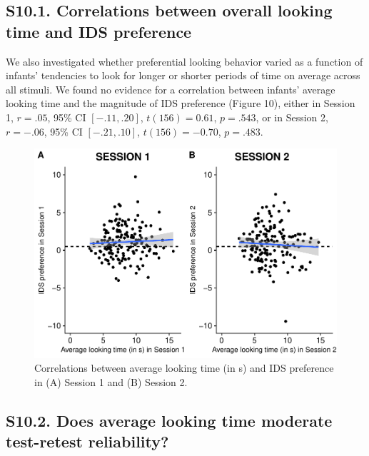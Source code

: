 \documentclass[
  english,
  man, donotrepeattitle,floatsintext]{apa6}
\begin{document}
\hypertarget{s10.1.-correlations-between-overall-looking-time-and-ids-preference}{%
\subsection{S10.1. Correlations between overall looking time and IDS preference}\label{s10.1.-correlations-between-overall-looking-time-and-ids-preference}}

We also investigated whether preferential looking behavior varied as a function of infants' tendencies to look for longer or shorter periods of time on average across all stimuli. We found no evidence for a correlation between infants' average looking time and the magnitude of IDS preference (Figure 10), either in Session 1, \(r = .05\), 95\% CI \([-.11, .20]\), \(t(156) = 0.61\), \(p = .543\), or in Session 2, \(r = -.06\), 95\% CI \([-.21, .10]\), \(t(156) = -0.70\), \(p = .483\).

\begin{figure}

{\centering \includegraphics{MB1T_supplement_files/figure-latex/sfig10-1} 

}

\caption{Correlations between average looking time (in s) and IDS preference in (A) Session 1 and (B) Session 2.}\label{fig:sfig10}
\end{figure}

\hypertarget{s10.2.-does-average-looking-time-moderate-test-retest-reliability}{%
\subsection{S10.2. Does average looking time moderate test-retest reliability?}\label{s10.2.-does-average-looking-time-moderate-test-retest-reliability}}
\end{document}
